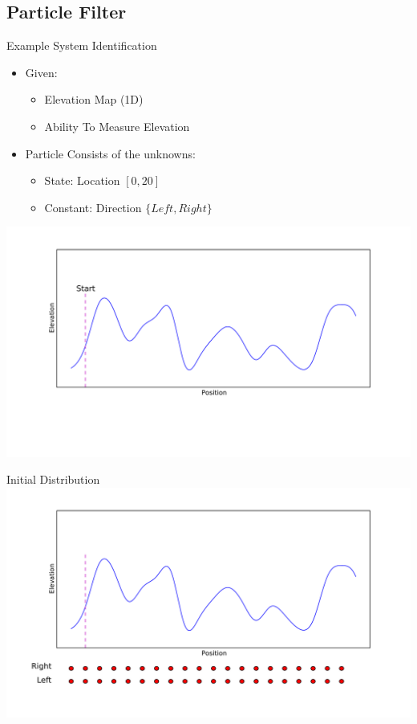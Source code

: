\documentclass{beamer}
\begin{document}
\subsection{Particle Filter}
\begin{frame}{Example System Identification}
\begin{itemize}
\item Given:
    \begin{itemize}
    \item Elevation Map (1D)
    \item Ability To Measure Elevation
    \end{itemize}
\item Particle Consists of the unknowns:
    \begin{itemize}
    \item State: Location  $[0, 20]$
    \item Constant: Direction  $\{Left, Right\}$
    \end{itemize}
\end{itemize}

\begin{center}
\includegraphics[clip=true,trim=2cm 3cm 3cm 3cm,width=.7\textwidth]{setup}
\end{center}
\end{frame}

\begin{frame}{Initial Distribution}
\centering
\includegraphics[width=\textwidth]{init}\\
\end{frame}
\end{document}
